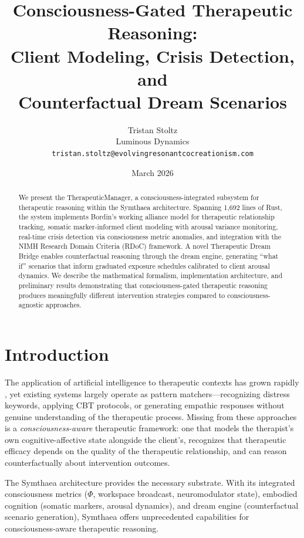 \documentclass[11pt,a4paper]{article}
\title{Consciousness-Gated Therapeutic Reasoning:\\Client Modeling, Crisis Detection, and\\Counterfactual Dream Scenarios}
\author{Tristan Stoltz\\
Luminous Dynamics\\
\texttt{tristan.stoltz@evolvingresonantcocreationism.com}}
\date{March 2026}
\begin{document}
\maketitle

\begin{abstract}
We present the TherapeuticManager, a consciousness-integrated subsystem for therapeutic reasoning within the Symthaea architecture. Spanning 1,692 lines of Rust, the system implements Bordin's working alliance model for therapeutic relationship tracking, somatic marker-informed client modeling with arousal variance monitoring, real-time crisis detection via consciousness metric anomalies, and integration with the NIMH Research Domain Criteria (RDoC) framework. A novel Therapeutic Dream Bridge enables counterfactual reasoning through the dream engine, generating ``what if'' scenarios that inform graduated exposure schedules calibrated to client arousal dynamics. We describe the mathematical formalism, implementation architecture, and preliminary results demonstrating that consciousness-gated therapeutic reasoning produces meaningfully different intervention strategies compared to consciousness-agnostic approaches.
\end{abstract}

\section{Introduction}

The application of artificial intelligence to therapeutic contexts has grown rapidly \citep{fitzpatrick2017,abd2019}, yet existing systems largely operate as pattern matchers---recognizing distress keywords, applying CBT protocols, or generating empathic responses without genuine understanding of the therapeutic process. Missing from these approaches is a \emph{consciousness-aware} therapeutic framework: one that models the therapist's own cognitive-affective state alongside the client's, recognizes that therapeutic efficacy depends on the quality of the therapeutic relationship, and can reason counterfactually about intervention outcomes.

The Symthaea architecture \citep{stoltz2026symthaea} provides the necessary substrate. With its integrated consciousness metrics ($\Phi$, workspace broadcast, neuromodulator state), embodied cognition (somatic markers, arousal dynamics), and dream engine (counterfactual scenario generation), Symthaea offers unprecedented capabilities for consciousness-aware therapeutic reasoning.
\end{document}
